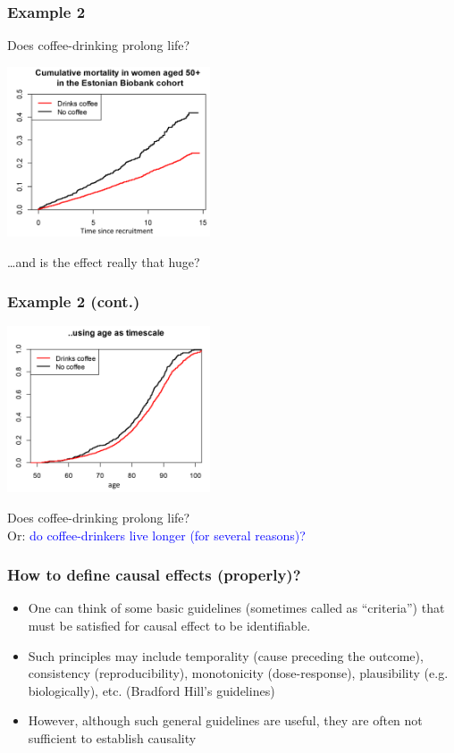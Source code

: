 \documentclass[10pt,dvipsnames,t,handout%
,aspectratio=169%
]{beamer}%
\begin{document}
\begin{frame}
	\frametitle{Example 2}
\begin{block}{}
	Does coffee-drinking prolong life? 
\end{block}
\includegraphics[width=6cm]{kohv_egv_1} \\
\begin{block}{}
\ldots and is the effect really that huge?
\end{block}
\end{frame}

\begin{frame}
	\frametitle{Example 2 (cont.)}
	\includegraphics[width=6cm]{kohv_egv_2} \\
\begin{block}{}
	Does coffee-drinking prolong life? \\
Or: \textcolor{blue}{do coffee-drinkers live longer (for several reasons)?}
\end{block}
\end{frame}

\begin{frame}
	\frametitle{How to define causal effects (properly)?}
	\begin{itemize}
		\item One can think of some basic guidelines (sometimes called as ``criteria'') that must be satisfied for causal effect to be identifiable. 
		\item Such principles may include temporality (cause preceding the outcome), consistency (reproducibility), monotonicity (dose-response), plausibility (e.g. biologically), etc. (Bradford Hill's guidelines)
		\item \alert{However, although such general guidelines are useful, they are often not sufficient to establish causality}
	\end{itemize}
\end{frame}
\end{document}
